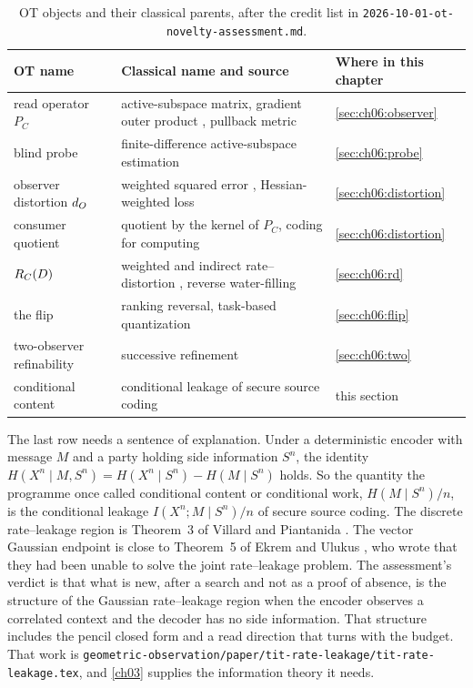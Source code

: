 \begin{table}[ht]\small\centering
\begin{tabular}{@{}p{3.6cm}p{6.2cm}p{3.4cm}@{}}
\toprule
OT name & Classical name and source & Where in this chapter \\
\midrule
read operator $P_C$ & active-subspace matrix, gradient outer product \cite{constantine2014,constantine2015}, pullback metric & \cref{sec:ch06:observer} \\
blind probe & finite-difference active-subspace estimation \cite{constantine2015} & \cref{sec:ch06:probe} \\
observer distortion $d_O$ & weighted squared error \cite{sakrison1968}, Hessian-weighted loss \cite{dong2019hawq} & \cref{sec:ch06:distortion} \\
consumer quotient & quotient by the kernel of $P_C$, coding for computing \cite{orlitskyroche2001} & \cref{sec:ch06:distortion} \\
$R_C(D)$ & weighted and indirect rate--distortion \cite{sakrison1968,dobrushin1962,wolfziv1970,witsenhausen1980}, reverse water-filling \cite{coverthomas2006} & \cref{sec:ch06:rd} \\
the flip & ranking reversal, task-based quantization \cite{shlezinger2019} & \cref{sec:ch06:flip} \\
two-observer refinability & successive refinement \cite{equitzcover1991,rimoldi1994,nayak2010} & \cref{sec:ch06:two} \\
conditional content & conditional leakage of secure source coding \cite{villard2013,ekrem2013} & this section \\
\bottomrule
\end{tabular}
\caption{OT objects and their classical parents, after the credit list in \texttt{2026-10-01-ot-novelty-assessment.md}.}
\label{tab:ch06:parents}
\end{table}

The last row needs a sentence of explanation. Under a deterministic encoder with message $M$ and a party holding side information $S^n$, the identity $H(X^n\mid M,S^n)=H(X^n\mid S^n)-H(M\mid S^n)$ holds. So the quantity the programme once called conditional content or conditional work, $H(M\mid S^n)/n$, is the conditional leakage $I(X^n;M\mid S^n)/n$ of secure source coding. The discrete rate--leakage region is Theorem~3 of Villard and Piantanida \cite{villard2013}. The vector Gaussian endpoint is close to Theorem~5 of Ekrem and Ulukus \cite{ekrem2013}, who wrote that they had been unable to solve the joint rate--leakage problem. The assessment's verdict is that what is new, after a search and not as a proof of absence, is the structure of the Gaussian rate--leakage region when the encoder observes a correlated context and the decoder has no side information. That structure includes the pencil closed form and a read direction that turns with the budget. That work is \texttt{geometric-\allowbreak observation/\allowbreak paper/\allowbreak tit-\allowbreak rate-\allowbreak leakage/\allowbreak tit-\allowbreak rate-\allowbreak leakage.tex}, and \cref{ch03} supplies the information theory it needs.

